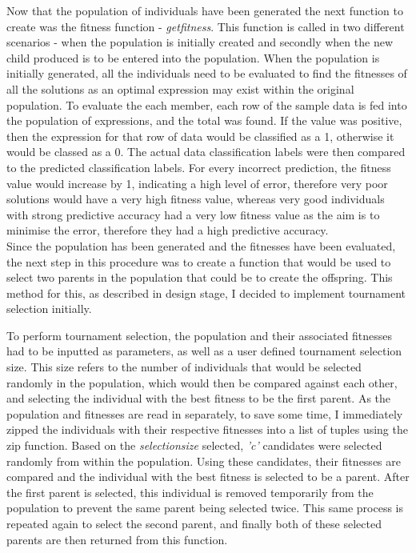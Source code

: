 \documentclass[11pt]{article}
\begin{document}
Now that the population of individuals have been generated the next function to create was the fitness function - \textit{get\textunderscore fitness}. This function is called in two different scenarios - when the population is initially created and secondly when the new child produced is to be entered into the population. When the population is initially generated, all the individuals need to be evaluated to find the fitnesses of all the solutions as an optimal expression may exist within the original population. To evaluate the each member, each row of the sample data is fed into the population of expressions, and the total was found. If the value was positive, then the expression for that row of data would be classified as a 1, otherwise it would be classed as a 0. The actual data classification labels were then compared to the predicted classification labels. For every incorrect prediction, the fitness value would increase by 1, indicating a high level of error, therefore very poor solutions would have a very high fitness value, whereas very good individuals with strong predictive accuracy had a very low fitness value as the aim is to minimise the error, therefore they had a high predictive accuracy.\\

Since the population has been generated and the fitnesses have been evaluated, the next step in this procedure was to create a function that would be used to select two parents in the population that could be to create the offspring. This method for this, as described in design stage, I decided to implement tournament selection initially.

To perform tournament selection, the population and their associated fitnesses had to be inputted as parameters, as well as a user defined tournament selection size. This size refers to the number of individuals that would be selected randomly in the population, which would then be compared against each other, and selecting the individual with the best fitness to be the first parent. As the population and fitnesses are read in separately, to save some time, I immediately zipped the individuals with their respective fitnesses into a list of tuples using the zip function. Based on the \textit{selection\textunderscore size} selected, \textit{'c'} candidates were selected randomly from within the population.  Using these candidates, their fitnesses are compared and the individual with the best fitness is selected to be a parent. 
After the first parent is selected, this individual is removed temporarily from the population to prevent the same parent being selected twice. This same process is repeated again to select the second parent, and finally both of these selected parents are then returned from this function. \\
\end{document}
